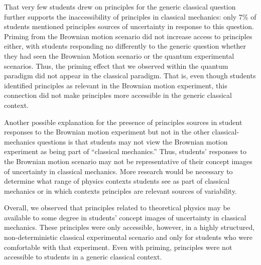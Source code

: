 \documentclass[english,aps,prstper,reprint,showpacs,longbibliography,superscriptaddress,nofootinbib]{revtex4-2}
\begin{document}
That very few students drew on principles for the generic classical question further supports the inaccessibility of principles in classical mechanics: only 7\% of students mentioned principles sources of uncertainty in response to this question. Priming from the Brownian motion scenario did not increase access to principles either, with students responding no differently to the generic question whether they had seen the Brownian Motion scenario or the quantum experimental scenarios. Thus, the priming effect that we observed within the quantum paradigm did not appear in the classical paradigm. That is, even though students identified  principles as relevant in the Brownian motion experiment, this connection did not make  principles more accessible in the generic classical context.

Another possible explanation for the presence of principles sources in student responses to the Brownian motion experiment but not in the other classical-mechanics questions is that students may not view the Brownian motion experiment as being part of ``classical mechanics.'' Thus, students' responses to the Brownian motion scenario may not be representative of their concept images of uncertainty in classical mechanics. More research would be necessary to determine what range of physics contexts students see as part of classical mechanics or in which contexts principles are relevant sources of variability.

Overall, we observed that principles related to theoretical physics may be available to some degree in students' concept images of uncertainty in classical mechanics. These principles were only accessible, however, in a highly structured, non-deterministic classical experimental scenario and only for students who were comfortable with that experiment. Even with priming, principles were not accessible to students in a generic classical context. %

\end{document}
